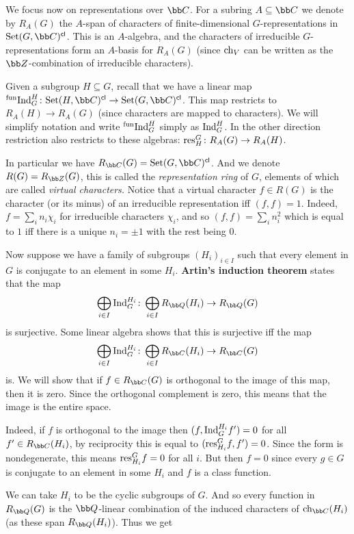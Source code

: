 We focus now on representations over $\bC$.
For a subring $A\subseteq\bC$ we denote by $R_A(G)$ the $A$-span of characters of finite-dimensional $G$-representations in $\St(G,\bC)^\cl$.
This is an $A$-algebra, and the characters of irreducible $G$-representations form an $A$-basis for $R_A(G)$ (since ${\rm ch}_V$ can be written as the
$\bZ$-combination of irreducible characters).

Given a subgroup $H\subseteq G$, recall that we have a linear map $\find^H_G\colon\St(H,\bC)^\cl\to\St(G,\bC)^\cl$.
This map restricts to $R_A(H)\to R_A(G)$ (since characters are mapped to characters).
We will simplify notation and write ${}^{\rm fun}{\rm Ind}^H_G$ simply as ${\rm Ind}^H_G$.
In the other direction restriction also restricts to these algebras: ${\rm res}^G_H\colon R_A(G)\to R_A(H)$.

In particular we have $R_\bC(G)=\St(G,\bC)^\cl$.
And we denote $R(G)=R_\bZ(G)$, this is called the {\it representation ring} of $G$, elements of which are called {\it virtual characters.}
Notice that a virtual character $f\in R(G)$ is the character (or its minus) of an irreducible representation iff $(f,f)=1$.
Indeed, $f=\sum_in_i\chi_i$ for irreducible characters $\chi_i$, and so $(f,f)=\sum_in_i^2$ which is equal to $1$ iff there is a unique $n_i=\pm1$
with the rest being $0$.

Now suppose we have a family of subgroups $(H_i)_{i\in I}$ such that every element in $G$ is conjugate to an element in some $H_i$.
{\bf Artin's induction theorem} states that the map
$$ \bigoplus_{i\in I}\Ind^{H_i}_G\colon\bigoplus_{i\in I}R_\bQ(H_i)\to R_\bQ(G) $$
is surjective.
Some linear algebra shows that this is surjective iff the map
$$ \bigoplus_{i\in I}\Ind^{H_i}_G\colon\bigoplus_{i\in I}R_\bC(H_i)\to R_\bC(G) $$
is.
We will show that if $f\in R_\bC(G)$ is orthogonal to the image of this map, then it is zero.
Since the orthogonal complement is zero, this means that the image is the entire space.

Indeed, if $f$ is orthogonal to the image then $(f,{\rm Ind}^{H_i}_Gf')=0$ for all $f'\in R_\bC(H_i)$, by reciprocity this is equal to
$({\rm res}^G_{H_i}f,f')=0$.
Since the form is nondegenerate, this means ${\rm res}^G_{H_i}f=0$ for all $i$.
But then $f=0$ since every $g\in G$ is conjugate to an element in some $H_i$ and $f$ is a class function.

We can take $H_i$ to be the cyclic subgroups of $G$.
And so every function in $R_\bQ(G)$ is the $\bQ$-linear combination of the induced characters of $\ch_\bC(H_i)$ (as these span $R_\bQ(H_i)$).
Thus we get

